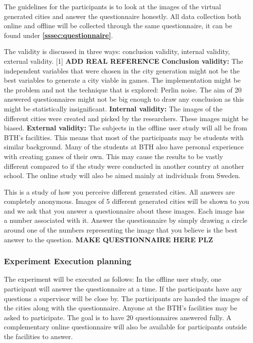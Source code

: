 		The guidelines for the participants is to look at the images of the virtual generated cities and answer the questionnaire honestly. All data collection both online and offline will be collected through the same questionnaire, it can be found under \textbf{\ref{sssec:questionnaire}}.
		
		The validity is discussed in three ways: conclusion validity, internal validity, external validity. [1] \textbf{ADD REAL REFERENCE}
		\textbf{Conclusion validity:} The independent variables that were chosen in the city generation might not be the best variables to generate a city viable in games. The implementation might be the problem and not the technique that is explored: Perlin noise. The aim of 20 answered questionnaires might not be big enough to draw any conclusion as this might be statistically insignificant.
		\textbf{Internal validity:} The images of the different cities were created and picked by the researchers. These images might be biased.
		\textbf{External validity:} The subjects in the offline user study will all be from BTH’s facilities. This means that most of the participants may be students with similar background. Many of the students at BTH also have personal experience with creating games of their own. This may cause the results to be vastly different compared to if the study were conducted in another country at another school. The online study will also be aimed mainly at individuals from Sweden.
		
		 \label{sssec:questionnaire}
		This is a study of how you perceive different generated cities.
		All answers are completely anonymous.
		Images of 5 different generated cities will be shown
		to you and we ask that you answer a questionnaire about these images.
		Each image has a number associated with it.
		Answer the questionnaire by simply drawing a circle
		around one of the numbers representing the image that you believe is the best
		answer to the question. \textbf{MAKE QUESTIONNAIRE HERE PLZ}
		
	\subsubsection{Experiment Execution planning}
	The experiment will be executed as follows:
	In the offline user study, one participant will answer the questionnaire at a time. If the participants have any questions a supervisor will be close by. The participants are handed the images of the cities along with the questionnaire. Anyone at the BTH’s facilities may be asked to participate. The goal is to have 20 questionnaires answered fully. A complementary online questionnaire will also be available for participants outside the facilities to answer.
	

